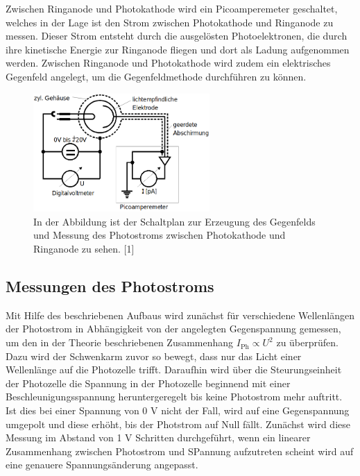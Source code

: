 \documentclass[titlepage = firstcover]{scrartcl}
\begin{document}
            \FloatBarrier

            \noindent
            Zwischen Ringanode und Photokathode wird ein Picoamperemeter geschaltet, welches in der Lage ist den Strom zwischen Photokathode und Ringanode zu messen. Dieser Strom entsteht durch die
            ausgelösten Photoelektronen, die durch ihre kinetische Energie zur Ringanode fliegen und dort als Ladung aufgenommen werden. Zwischen Ringanode und Photokathode wird zudem ein elektrisches
            Gegenfeld angelegt, um die Gegenfeldmethode durchführen zu können.

            \FloatBarrier

                \begin{figure}[h]
                  \centering
                  \includegraphics[width = 0.6\textwidth]{Bilder/Schaltung.png}
                  \caption{In der Abbildung ist der Schaltplan zur Erzeugung des Gegenfelds und Messung des Photostroms zwischen Photokathode und Ringanode zu sehen. [1]}
                  \label{fig:Schaltung}
                \end{figure}

            \FloatBarrier

        \newpage
        \subsection{Messungen des Photostroms}
            Mit Hilfe des beschriebenen Aufbaus wird zunächst für verschiedene Wellenlängen der Photostrom in Abhängigkeit von der angelegten Gegenspannung gemessen, um den in der Theorie
            beschriebenen Zusammenhang $I_{\text{Ph}} \propto U^2$ zu überprüfen. Dazu wird der Schwenkarm zuvor so bewegt, dass nur das Licht einer Wellenlänge auf die Photozelle trifft. 
            Daraufhin wird über die Steurungseinheit der Photozelle die Spannung in der Photozelle beginnend mit einer Beschleunigungsspannung heruntergeregelt bis keine Photostrom mehr auftritt. 
            Ist dies bei einer Spannung von 0 V nicht der Fall, wird auf eine Gegenspannung umgepolt und diese erhöht, bis der Photstrom auf Null fällt. Zunächst wird diese Messung im Abstand von 1 V
            Schritten durchgeführt, wenn ein linearer Zusammenhang zwischen Photostrom und SPannung aufzutreten scheint wird auf eine genauere Spannungsänderung angepasst. \newline
            
\end{document}
